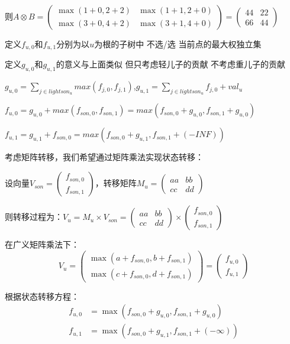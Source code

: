 \documentclass[a4paper, fontset=none]{ctexart}
\begin{document}
则$A \otimes B = \begin{pmatrix}\max(1+0, 2+2) & \max(1+1, 2+0) \\ \max(3+0, 4+2) & \max(3+1, 4+0)\end{pmatrix} = \begin{pmatrix}4 4&2 2\\6 6&4 4\end{pmatrix}$

定义$f_{u, 0}$和$f_{u, 1}$分别为以$u$为根的子树中 不选/选 当前点的最大权独立集

定义$g_{u, 0}$和$g_{u, 1}$的意义与上面类似 但只考虑轻儿子的贡献 不考虑重儿子的贡献

$g_{u, 0}=\sum\limits_{j\in lightson_u}max(f_{j, 0}, f_{j, 1})$,$g_{u, 1}={\sum\limits_{j\in lightson_u}f_{j, 0}}+val_u$

$f_{u, 0}=g_{u, 0}+max(f_{son, 0}, f_{son, 1})=max(f_{son, 0}+g_{u, 0}, f_{son, 1}+g_{u, 0})$

$f_{u, 1}=g_{u, 1}+f_{son, 0}=max(f_{son, 0}+g_{u, 1}, f_{son, 1}+(-INF))$

考虑矩阵转移，我们希望通过矩阵乘法实现状态转移：

设向量$V_{son} = \begin{pmatrix}f_{son, 0} \\ f_{son, 1}\end{pmatrix}$，转移矩阵$M_u = \begin{pmatrix}a a&b b\\c c&d d\end{pmatrix}$

则转移过程为：$V_u = M_u \times V_{son} = \begin{pmatrix}a a&b b\\c c&d d\end{pmatrix} \times \begin{pmatrix}f_{son, 0} \\ f_{son, 1}\end{pmatrix}$

在广义矩阵乘法下：
$$V_u = \begin{pmatrix}\max(a+f_{son, 0}, b+f_{son, 1}) \\ \max(c+f_{son, 0}, d+f_{son, 1})\end{pmatrix} = \begin{pmatrix}f_{u, 0} \\ f_{u, 1}\end{pmatrix}$$

根据状态转移方程：
\begin{align}
f_{u, 0} &= \max(f_{son, 0}+g_{u, 0}, f_{son, 1}+g_{u, 0}) \\
f_{u, 1} &= \max(f_{son, 0}+g_{u, 1}, f_{son, 1}+(-\infty))
\end{align}
\end{document}
